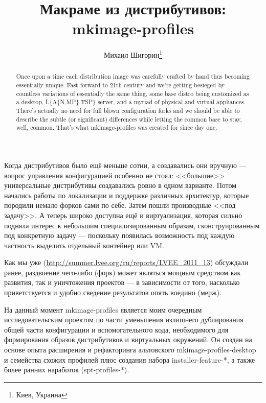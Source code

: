 \documentclass[10pt, a5paper]{article}
\begin{document}
\title{Макраме из дистрибутивов: mkimage-profiles}%

\author{Михаил Шигорин\footnote{Киев, Украина}}
\maketitle

\begin{abstract}
Once upon a time each distribution image was carefully crafted by hand thus becoming essentially unique.  Fast forward to 21th century and we're getting besieged by countless variations of essentially the same thing, some base distro being customized as a desktop, L\{A\{N,MP\},TSP\} server, and a myriad of physical and virtual appliances.
There's actually no need for full blown configuration forks and we should be able to describe the subtle (or significant) differences while letting the common base to stay, well, common.  That's what mkimage-profiles was created for since day one.
\end{abstract}


Когда дистрибутивов было ещё меньше сотни, а создавались они вручную --- вопрос управления конфигурацией особенно не стоял: <<большие>> универсальные дистрибутивы создавались ровно в одном варианте.  Потом начались работы по локализации и поддержке различных архитектур, которые породили немало форков сами по себе.  Затем пошли производные <<под задачу>>.  А теперь широко доступна ещё и виртуализация, которая сильно подняла интерес к небольшим специализированным образам, сконструированным под конкретную задачу --- поскольку появилась возможность под каждую частность выделить отдельный контейнер или VM.

Как мы  уже (\url{http://summer.lvee.org/ru/reports/LVEE_2011_13}) обсуждали ранее, раздвоение чего-либо (форк) может являться мощным средством как развития, так и уничтожения проектов --- в зависимости от того, насколько приветствуется и удобно сведение результатов опять воедино (мерж).

На данный момент mkimage-profiles является моим очередным исследовательским проектом по части уменьшения излишнего дублирования общей части конфигурации и вспомогательного кода, необходимого для формирования образов дистрибутивов и виртуальных окружений.  Он создан на основе опыта расширения и рефакторинга альтовского mkimage-profiles-desktop и семейства схожих профилей плюс создания набора installer-feature-*, а также более ранних наработок (spt-profiles-*).
\end{document}
